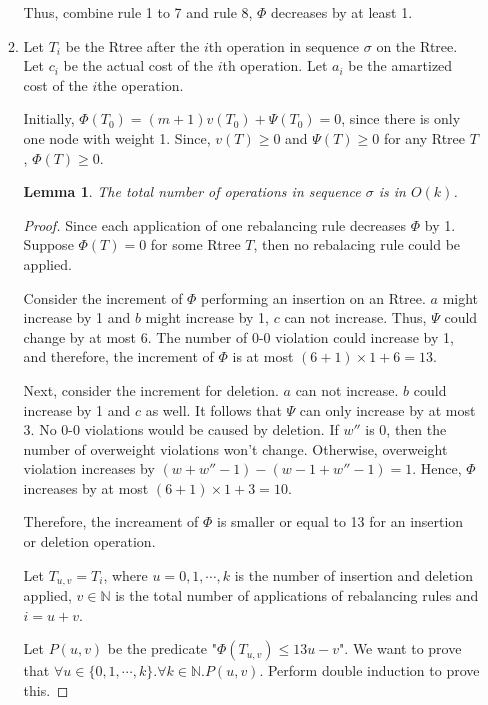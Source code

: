 \documentclass[10pt]{article}
\newtheorem{lemma}[theorem]{Lemma}
\begin{document}
\begin{enumerate}
\begin{enumerate}
				Thus, combine rule 1 to 7 and rule 8, $\Phi$ decreases by at least 1.
			
			\item 
				Let $T_i$ be the Rtree after the $i$th operation in sequence $\sigma$ on the Rtree.
				Let $c_i$ be the actual cost of the $i$th operation.
				Let $a_i$ be the amartized cost of the $i$the operation.

				Initially, $\Phi(T_0) = (m+1)v(T_0) + \Psi(T_0) = 0$, since
				there is only one node with weight 1.
				Since, $v(T) \geq 0$ and $\Psi(T) \geq 0$ for any Rtree $T$, $\Phi(T) \geq 0$.

				\begin{lemma}
					The total number of operations in sequence $\sigma$ is in $O(k)$.
				\end{lemma}
				\begin{proof}
					Since each application of one rebalancing rule decreases
					$\Phi$ by 1.
					Suppose $\Phi(T) = 0$ for some Rtree $T$, then no
					rebalacing rule could be applied.

					Consider the increment of $\Phi$ performing an insertion on an Rtree.
					$a$ might increase by 1 and $b$ might increase by 1, $c$
					can not increase. 
					Thus, $\Psi$ could change by at most 6. 
					The number of 0-0 violation could increase by 1, and
					therefore, the increment of $\Phi$ is at most $(6+1)\times1
					+ 6 = 13$.

					Next, consider the increment for deletion.
					$a$ can not increase. $b$ could increase by 1 and $c$ as
					well. 
					It follows that $\Psi$ can only increase by at most 3.
					No 0-0 violations would be caused by deletion. 
					If $w''$ is 0, then the number of overweight violations
					won't change.
					Otherwise, overweight violation increases by $(w+w''-1) -
					(w-1 + w''-1) = 1$.
					Hence, $\Phi$ increases by at most $(6+1) \times 1 + 3 =
					10$.

					Therefore, the increament of $\Phi$ is smaller or equal to
					13 for an insertion or deletion operation.

					Let $T_{u,v} = T_i$, where $u = 0, 1, \cdots, k$ is the number of insertion
					and deletion applied, $v \in \mathbb{N}$ is the total number of
					applications of rebalancing rules and $i = u + v$. 

					Let $P(u,v)$ be the predicate "$\Phi(T_{u,v}) \leq 13u-v$".
					We want to prove that $\forall u \in \{0, 1, \cdots, k\}.
					\forall k \in \mathbb{N}. P(u,v)$. Perform double induction
					to prove this.


\end{proof}
\end{enumerate}
\end{enumerate}
\end{document}
